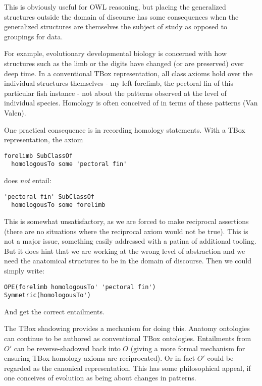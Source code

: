\documentclass{my}
\begin{document}
This is obviously useful for OWL reasoning, but placing the
generalized structures outside the domain of discourse has some
consequences when the generalized structures are themselves the
subject of study as opposed to groupings for data.

For example, evolutionary developmental biology is concerned with how
structures such as the limb or the digits have changed (or are
preserved) over deep time. In a conventional TBox representation, all
class axioms hold over the individual structures themselves - my left
forelimb, the pectoral fin of this particular fish instance - not
about the patterns observed at the level of individual
species. Homology is often conceived of in terms of these patterns
(Van Valen).

One practical consequence is in recording homology statements. With a
TBox representation, the axiom

\begin{verbatim}
forelimb SubClassOf 
  homologousTo some 'pectoral fin'
\end{verbatim}

does \emph{not} entail:

\begin{verbatim}
'pectoral fin' SubClassOf 
  homologousTo some forelimb
\end{verbatim}

This is somewhat unsatisfactory, as we are forced to make reciprocal
assertions (there are no situations where the reciprocal axiom would
not be true). This is not a major issue, something easily addressed
with a patina of additional tooling. But it does hint that we are
working at the wrong level of abstraction and we need the anatomical
structures to be in the domain of discourse. Then we could simply
write:

\begin{verbatim}
OPE(forelimb homologousTo' 'pectoral fin')
Symmetric(homologousTo')
\end{verbatim}

And get the correct entailments. 

The TBox shadowing provides a mechanism for doing this. Anatomy
ontologies can continue to be authored as conventional TBox
ontologies. Entailments from $O'$ can be reverse-shadowed back into
$O$ (giving a more formal mechanism for ensuring TBox homology axioms
are reciprocated). Or in fact $O'$ could be regarded as the canonical
representation. This has some philosophical appeal, if one conceives
of evolution as being about changes in patterns.
\end{document}
